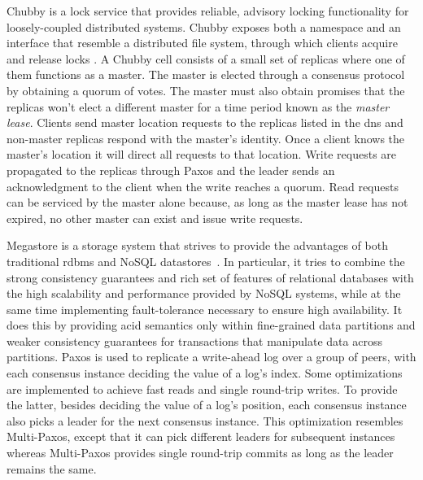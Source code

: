 Chubby is a lock service that provides reliable, advisory locking functionality for loosely-coupled distributed systems. Chubby exposes both a namespace and an interface that resemble a distributed file system, through which clients acquire and release locks \cite{Burrows2006}. A Chubby cell consists of a small set of replicas where one of them functions as a master. The master is elected through a consensus protocol by obtaining a quorum of votes. The master must also obtain promises that the replicas won't elect a different master for a time period known as the \textit{master lease}. Clients send master location requests to the replicas listed in the \acrfull{dns} and non-master replicas respond with the master's identity. Once a client knows the master's location it will direct all requests to that location. Write requests are propagated to the replicas through Paxos and the leader sends an acknowledgment to the client when the write reaches a quorum. Read requests can be serviced by the master alone because, as long as the master lease has not expired, no other master can exist and issue write requests.\par
Megastore is a storage system that strives to provide the advantages of both traditional \acrfull{rdbms} and NoSQL datastores~\cite{36971}. In particular, it tries to combine the strong consistency guarantees and rich set of features of relational databases with the high scalability and performance provided by NoSQL systems, while at the same time implementing fault-tolerance necessary to ensure high availability. It does this by providing \acrfull{acid} semantics only within fine-grained data partitions and weaker consistency guarantees for transactions that manipulate data across partitions. Paxos is used to replicate a write-ahead log over a group of peers, with each consensus instance deciding the value of a log's index. Some optimizations are implemented to achieve fast reads and single round-trip writes. To provide the latter, besides deciding the value of a log's position, each consensus instance also picks a leader for the next consensus instance. This optimization resembles Multi-Paxos, except that it can pick different leaders for subsequent instances whereas Multi-Paxos provides single round-trip commits as long as the leader remains the same. \par